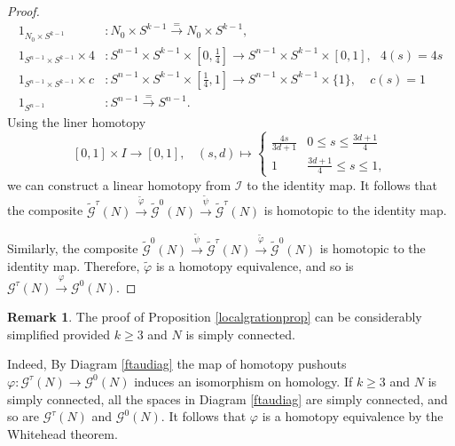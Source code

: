 \documentclass[a4]{amsart}
\theoremstyle{definition}
\newtheorem{remark}[theorem]{Remark}
\begin{document}
\begin{sloppypar}
\begin{proof}
\[\begin{split}
1_{N_0\times S^{k-1}}& :N_0\times S^{k-1}\stackrel{=}{\longrightarrow} N_0\times S^{k-1},   \\
1_{S^{n-1}\times S^{k-1}}\times 4& :  S^{n-1}\times S^{k-1}\times [0, \frac{1}{4}]\longrightarrow  S^{n-1}\times S^{k-1}\times [0, 1], \ \ \  4(s)=4s  \\
1_{S^{n-1}\times S^{k-1}} \times c &:S^{n-1}\times S^{k-1}\times [\frac{1}{4},1]\stackrel{}{\longrightarrow}  S^{n-1}\times S^{k-1} \times \{1\}, \ \  \ \ \       c(s)=1   \\ 
1_{S^{n-1}}& :S^{n-1} \stackrel{=}{\longrightarrow} S^{n-1}. 
\end{split}
\]
Using the liner homotopy
\[
[0, 1]\times I \stackrel{}{\longrightarrow} [0,1],   \ \ \ \ 
(s, d)\longmapsto 
\left\{\begin{array}{cc}
\frac{4s}{3d+1}& 0 \leq s \leq \frac{3d+1}{4} \\
1 &\frac{3d+1}{4}\leq s\leq 1,
\end{array}\right.
\]
we can construct a linear homotopy from $\mathcal{I}$ to the identity map. It follows that the composite $\widetilde{\mathcal{G}}^\tau(N)\stackrel{\widetilde{\varphi}}{\longrightarrow} \widetilde{\mathcal{G}}^0(N) \stackrel{\widetilde{\psi}}{\longrightarrow} \widetilde{\mathcal{G}}^\tau (N)$ is homotopic to the identity map. 

Similarly, the composite $\widetilde{\mathcal{G}}^0(N)\stackrel{\widetilde{\psi}}{\longrightarrow} \widetilde{\mathcal{G}}^\tau(N) \stackrel{\widetilde{\varphi}}{\longrightarrow} \widetilde{\mathcal{G}}^0 (N)$ is homotopic to the identity map. Therefore, $\widetilde{\varphi}$ is a homotopy equivalence, and so is $\mathcal{G}^{\tau}(N)\stackrel{\varphi}{\longrightarrow}\mathcal{G}^{0}(N)$.
\end{proof}

\begin{remark}
The proof of Proposition \ref{localgrationprop} can be considerably simplified provided $k\geq 3$ and $N$ is simply connected. 

Indeed, By Diagram \eqref{ftaudiag} the map of homotopy pushouts $\varphi: \mathcal{G}^{\tau}(N)\stackrel{}{\longrightarrow}\mathcal{G}^{0}(N)$ induces an isomorphism on homology. If $k\geq 3$ and $N$ is simply connected, all the spaces in Diagram \eqref{ftaudiag} are simply connected, and so are $\mathcal{G}^{\tau}(N)$ and $\mathcal{G}^{0}(N)$. It follows that $\varphi$ is a homotopy equivalence by the Whitehead theorem.
\end{remark}


\end{sloppypar}
\end{document}
